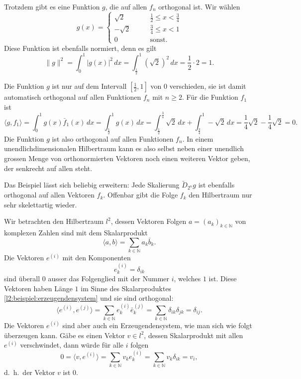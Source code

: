 \begin{beispiel}
Trotzdem gibt es eine Funktion $g$, die auf allen $f_n$ orthogonal ist.
Wir wählen
\[
g(x) = \begin{cases}
\sqrt{2}&\qquad \frac12 \le x < \frac34\\
-\sqrt{2}&\qquad \frac34 \le x < 1\\
0&\qquad\text{sonst.}
\end{cases}
\]
Diese Funktion ist ebenfalls normiert, denn es gilt
\[
\|g\|^2
=
\int_0^1 |g(x)|^2 \,dx
=
\int_{\frac12}^1 (\!\sqrt{2})^2\,dx
=
\frac12\cdot 2 = 1.
\]

Die Funktion $g$ ist nur auf dem Intervall $[\frac12,1]$ von $0$ verschieden,
sie ist damit automatisch orthogonal auf allen Funktionen $f_n$ mit $n\ge 2$.
Für die Funktion $f_1$ ist
\[
\langle g,f_1\rangle
=
\int_0^1 g(x)\bar{f}_1(x)\,dx
=
\int_{\frac12}^1 g(x)\,dx
=
\int_{\frac12}^{\frac34}\sqrt{2}\,dx
+
\int_{\frac34}^1-\sqrt{2}\,dx
=
\frac14 \sqrt{2} - \frac14 \sqrt{2} = 0.
\]
Die Funktion $g$ ist also orthogonal auf allen Funktionen $f_n$.
In einem unendlichdimensionalen Hilbertraum kann es also selbst
neben einer unendlich grossen Menge von orthonormierten Vektoren 
noch einen weiteren Vektor geben, der senkrecht auf allen steht.
\end{beispiel}

Das Beispiel lässt sich beliebig erweitern: Jede Skalierung
$\tilde{D}_{2^n}g$ ist ebenfalls orthogonal auf allen Vektoren $f_k$.
Offenbar gibt die Folge $f_k$ den Hilbertraum nur sehr skelettartig wieder.

\begin{beispiel}
Wir betrachten den Hilbertraum $l^2$, dessen Vektoren Folgen
$a=(a_k)_{k\in\mathbb N}$ von komplexen Zahlen sind mit dem Skalarprodukt
\begin{equation}
\langle a,b\rangle = \sum_{k\in\mathbb N} a_k\bar{b}_k.
\label{l2:beispiel:erzeugendensystem}
\end{equation}
Die Vektoren $e^{(i)}$ mit den Komponenten
\[
e^{(i)}_k = \delta_{ik}
\]
sind überall $0$ ausser das Folgenglied mit der Nummer $i$, welches $1$
ist. 
Diese Vektoren haben Länge $1$ im Sinne des Skalarproduktes
\eqref{l2:beispiel:erzeugendensystem} und sie sind orthogonal:
\[
\langle e^{(i)}, e^{(j)}\rangle
=
\sum_{k\in\mathbb N} e^{(i)}_k\bar{e}^{(j)}_k
=
\sum_{k\in\mathbb N} \delta_{ik}\delta_{jk}
=
\delta_{ij}.
\]
Die Vektoren $e^{(i)}$ sind aber auch ein Erzeugendensystem, wie man sich
wie folgt überzeugen kann.
Gäbe es einen Vektor $v\in l^2$, dessen Skalarprodukt mit allen $e^{(i)}$
verschwindet, dann würde für alle $i$ folgen
\[
0
=
\langle v,e^{(i)}\rangle
=
\sum_{k\in\mathbb N} v_ke^{(i)}_k
=
\sum_{k\in\mathbb N} v_k\delta_{ik}
=
v_i,
\]
d.~h.~der Vektor $v$ ist $0$.
\end{beispiel}

